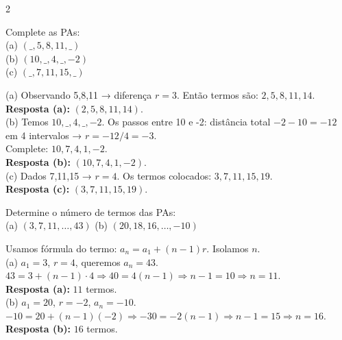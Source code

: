 \documentclass[11pt]{article}
\begin{document}
\begin{multicols}{2}
\begin{tcolorbox}[colback=blue!8,colframe=blue!60!black, title=\textbf{Questão 8 }, text width=0.9\columnwidth]
Complete as PAs: \\
(a) $(\_,5,8,11,\_)$ \\ (b) $(10,\_,4,\_,-2)$ \\ (c) $(\_,7,11,15,\_)$
\end{tcolorbox}

\begin{tcolorbox}[colback=green!10,colframe=green!60!black, title=\textbf{Solução da questão 8 }, text width=0.9\columnwidth]
(a) Observando 5,8,11 → diferença $r=3$. Então termos são: $2,5,8,11,14$. \\
\textbf{Resposta (a):} $(2,5,8,11,14)$. \\

(b) Temos $10, \_, 4, \_, -2$. Os passos entre 10 e -2: distância total $-2-10=-12$ em 4 intervalos → $r=-12/4=-3$. \\
Complete: $10,7,4,1,-2$. \\
\textbf{Resposta (b):} $(10,7,4,1,-2)$. \\

(c) Dados 7,11,15 → $r=4$. Os termos colocados: $3,7,11,15,19$. \\
\textbf{Resposta (c):} $(3,7,11,15,19)$.
\end{tcolorbox}

\begin{tcolorbox}[colback=blue!8,colframe=blue!60!black, title=\textbf{Questão 9 }, text width=0.9\columnwidth]
Determine o número de termos das PAs: \\
(a) $(3,7,11,\ldots,43)$ \quad (b) $(20,18,16,\ldots,-10)$
\end{tcolorbox}

\begin{tcolorbox}[colback=green!10,colframe=green!60!black, title=\textbf{Solução da questão 9 }, text width=0.9\columnwidth]
Usamos fórmula do termo: $a_n = a_1 + (n-1)r$. Isolamos $n$.\\

(a) $a_1=3$, $r=4$, queremos $a_n=43$. \\
$43 = 3 + (n-1)\cdot4 \Rightarrow 40 = 4(n-1) \Rightarrow n-1=10 \Rightarrow n=11$. \\
\textbf{Resposta (a):} $11$ termos. \\

(b) $a_1=20$, $r=-2$, $a_n = -10$. \\
$-10 = 20 + (n-1)(-2) \Rightarrow -30 = -2(n-1) \Rightarrow n-1 = 15 \Rightarrow n=16$. \\
\textbf{Resposta (b):} $16$ termos.
\end{tcolorbox}


\end{multicols}
\end{document}
